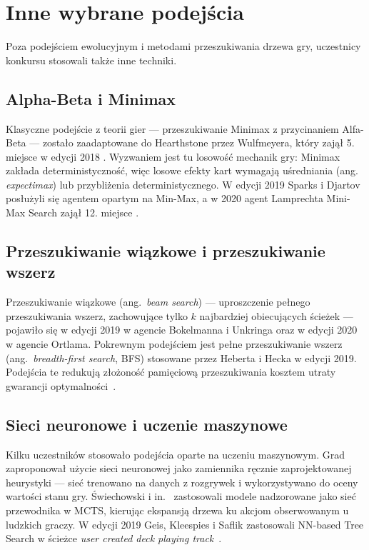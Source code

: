 \section{Inne wybrane podejścia}

Poza podejściem ewolucyjnym i metodami przeszukiwania drzewa gry, uczestnicy konkursu stosowali także inne techniki.

\subsection{Alpha-Beta i Minimax}

Klasyczne podejście z teorii gier --- przeszukiwanie Minimax z przycinaniem Alfa-Beta --- zostało zaadaptowane do Hearthstone przez Wulfmeyera, który zajął 5. miejsce w edycji 2018 \cite{hearthstone_competition}. Wyzwaniem jest tu losowość mechanik gry: Minimax zakłada deterministyczność, więc losowe efekty kart wymagają uśredniania (ang. \textit{expectimax}) lub przybliżenia deterministycznego. W edycji 2019 Sparks i Djartov posłużyli się agentem opartym na Min-Max, a w 2020 agent Lamprechta Mini-Max Search zajął 12. miejsce \cite{hearthstone_competition}.

\subsection{Przeszukiwanie wiązkowe i przeszukiwanie wszerz}

Przeszukiwanie wiązkowe (ang.~\textit{beam search}) --- uproszczenie pełnego przeszukiwania wszerz, zachowujące tylko $k$ najbardziej obiecujących ścieżek --- pojawiło się w edycji 2019 w agencie Bokelmanna i Unkringa oraz w edycji 2020 w agencie Ortlama. Pokrewnym podejściem jest pełne przeszukiwanie wszerz (ang.~\textit{breadth-first search}, BFS) stosowane przez Heberta i Hecka w edycji 2019. Podejścia te redukują złożoność pamięciową przeszukiwania kosztem utraty gwarancji optymalności~\cite{hearthstone_competition}.

\subsection{Sieci neuronowe i uczenie maszynowe}

Kilku uczestników stosowało podejścia oparte na uczeniu maszynowym. Grad~\cite{Grad2017} zaproponował użycie sieci neuronowej jako zamiennika ręcznie zaprojektowanej heurystyki --- sieć trenowano na danych z rozgrywek i wykorzystywano do oceny wartości stanu gry. Świechowski i in.~\cite{swiechowski2018} zastosowali modele nadzorowane jako sieć przewodnika w MCTS, kierując ekspansją drzewa ku akcjom obserwowanym u ludzkich graczy. W edycji 2019 Geis, Kleespies i Saflik zastosowali NN-based Tree Search w ścieżce \textit{user created deck playing track}~\cite{hearthstone_competition}.

